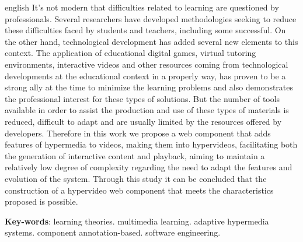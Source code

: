 \begin{resumo}[Abstract]
 \begin{otherlanguage*}{english}
   It's not modern that difficulties related to learning are questioned by professionals. Several researchers have developed methodologies seeking to reduce these difficulties faced by students and teachers, including some successful. On the other hand, technological development has added several new elements to this context. The application of educational digital games, virtual tutoring environments, interactive videos and other resources coming from technological developments at the educational context in a properly way, has proven to be a strong ally at the time to minimize the learning problems and also demonstrates the professional interest for these types of solutions. But the number of tools available in order to assist the production and use of these types of materials is reduced, difficult to adapt and are usually limited by the resources offered by developers. Therefore in this work we propose a web component that adds features of hypermedia to videos, making them into hypervideos, facilitating both the generation of interactive content and playback, aiming to maintain a relatively low degree of complexity regarding the need to adapt the features and evolution of the system. Through this study it can be concluded that the construction of a hypervideo web component that meets the characteristics proposed is possible.

   \vspace{\onelineskip}
 
   \noindent 
   \textbf{Key-words}: learning theories. multimedia learning. adaptive hypermedia systems. component annotation-based. software engineering.
 \end{otherlanguage*}
\end{resumo}
